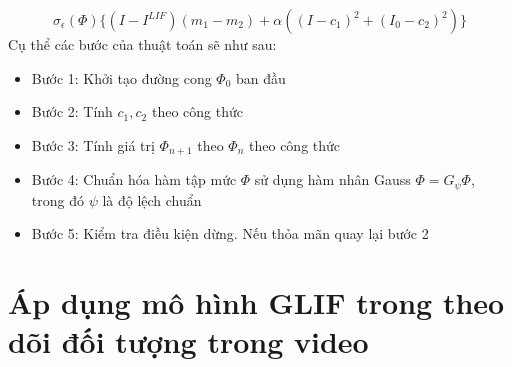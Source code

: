 \documentclass[12pt,oneside,a4]{report}
\begin{document}
\begin{equation}
\sigma_{\epsilon}(\Phi)\{(I-I^{LIF})(m_1-m_2)+\alpha((I-c_1)^2+ (I_0-c_2)^2)\}
\end{equation}
Cụ thể các bước của thuật toán sẽ như sau:
\begin{itemize}
\item Bước 1: Khởi tạo đường cong $\Phi_0$ ban đầu
\item Bước 2: Tính $c_1, c_2$ theo công thức 
\item Bước 3: Tính giá trị $\Phi_{n+1}$ theo $\Phi_{n}$ theo công thức 
\item Bước 4: Chuẩn hóa hàm tập mức $\Phi$ sử dụng hàm nhân Gauss $\Phi=G_{\psi}\Phi$, trong đó $\psi$ là độ lệch chuẩn
\item Bước 5: Kiểm tra điều kiện dừng. Nếu thỏa mãn quay lại bước 2
\end{itemize}
\chapter{Áp dụng mô hình GLIF trong theo dõi đối tượng trong video }
\end{document}
